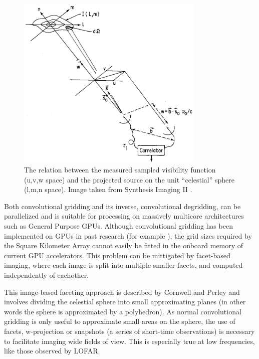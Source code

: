 \documentclass[a4paper, two column]{article}
\begin{document}
\begin{figure}[h]
 \begin{mdframed}
 \centering
 \includegraphics[width=0.8\textwidth]{lmn_uvw.png}
 \caption[The relation between image space and visibilities]{The relation between the measured sampled visibility function (u,v,w space) and the projected source on the unit ``celestial'' sphere (l,m,n space). Image taken from Synthesis Imaging II \cite{taylor1999synthesis}.}
  \label{FIG_APERTURE_SYNTH}
 \end{mdframed}
\end{figure}

Both convolutional gridding and its inverse, convolutional degridding, can be parallelized and is suitable for processing on massively multicore architectures such as General Purpose GPUs. Although convolutional gridding 
has been implemented on GPUs in past research (for example \cite{romein2012efficient}), the grid sizes required by the Square Kilometer Array cannot easily be fitted in the onboard memory of current GPU accelerators. This problem can be mittigated by facet-based
imaging, where each image is split into multiple smaller facets, and computed independently of eachother. 

This image-based faceting approach is described by Cornwell and Perley \cite{cornwell1992radio} and involves dividing the celestial sphere into small approximating planes (in other words the sphere is approximated by a polyhedron). 
As normal convolutional gridding is only useful to approximate small areas on the sphere, the use of facets, w-projection \cite{cornwell2005w} or snapshots (a series of short-time observations) is 
necessary to facilitate imaging wide fields of view. This is especially true at low frequencies, like those observed by LOFAR. 
\end{document}
